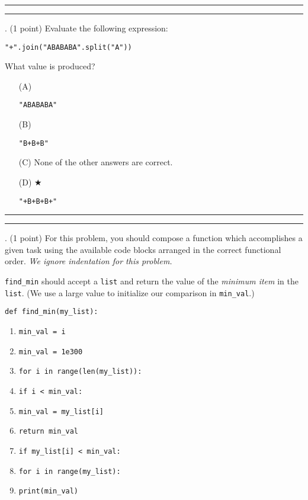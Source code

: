 \documentclass{article}
\begin{document}
\vspace*{2em}
\hrule
\vspace{2em}

\vspace{2em}
\hrule height 2pt


\newpage
{}. (1 point)
Evaluate the following expression:
\begin{verbatim}
"+".join("ABABABA".split("A"))
\end{verbatim}
What value is produced?


\begin{enumerate}
\item[(A)]
\begin{verbatim}"ABABABA"\end{verbatim}

\item[(B)]
\begin{verbatim}"B+B+B"\end{verbatim}

\item[(C)]
None of the other answers are correct.

\item[(D)] $\bigstar$ 
\begin{verbatim}"+B+B+B+"\end{verbatim}

\end{enumerate}

\vspace*{2em}
\hrule
\vspace{2em}

\vspace{2em}
\hrule height 2pt


\newpage
{}. (1 point)
For this problem, you should compose a function which accomplishes a given task using the available code blocks arranged in the correct functional order.  \emph{We ignore indentation for this problem.}

\texttt{find\_min} should accept a \texttt{list} and return the value of the \emph{minimum item} in the \texttt{list}.  (We use a large value to initialize our comparison in \texttt{min\_val}.)

\begin{verbatim}
def find_min(my_list):
\end{verbatim}

\begin{enumerate}[1]
\item \texttt{min\_val = i}
\item \texttt{min\_val = 1e300}
\item \texttt{for i in range(len(my\_list)):}
\item \texttt{if i < min\_val:}
\item \texttt{min\_val = my\_list[i]}
\item \texttt{return min\_val}
\item \texttt{if my\_list[i] < min\_val:}
\item \texttt{for i in range(my\_list):}
\item \texttt{print(min\_val)}
\end{enumerate}
\end{document}
